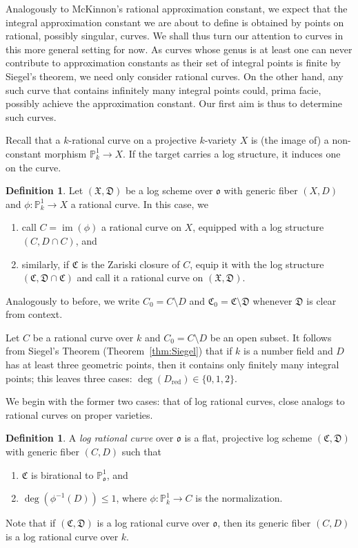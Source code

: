 \documentclass[a4paper, twoside, 11pt]{amsart}
\theoremstyle{definition}
\newtheorem{definition}[theorem]{Definition}
\newcommand{\mC}{\mathfrak{C}}
\newcommand{\mD}{\mathfrak{D}}
\newcommand{\mX}{\mathfrak{X}}
\newcommand{\fo}{\mathfrak{o}}
\newcommand{\PP}{\mathbb{P}}
\DeclareMathOperator{\im}{im}
\newcommand{\red}{\mathrm{red}}
\begin{document}
Analogously to McKinnon's rational approximation constant, we expect that the integral approximation constant we are about to define is obtained by points on rational, possibly singular, curves. We shall thus turn our attention to curves in this more general setting for now.
As curves whose genus is at least one can never contribute to approximation constants as their set of integral points is finite by Siegel's theorem, we need only consider rational curves.
On the other hand, any such curve that contains infinitely many integral points could, prima facie, possibly achieve the approximation constant. Our first aim is thus to determine such curves.

Recall that a $k$-rational curve on a projective $k$-variety $X$ is (the image of) a non-constant morphism $\PP^1_k\to X$. If the target carries a log structure, it induces one on the curve.
\begin{definition}
	Let $(\mX,\mD)$ be a log scheme over $\fo$ with generic fiber $(X,D)$ and $\phi\colon \PP^1_k\to X$ a rational curve. In this case, we
	\begin{enumerate}
		\item call $C=\im(\phi)$ a rational curve on $X$, equipped with a log structure $(C,D\cap C)$, and
		\item similarly, if $\mC$ is the Zariski closure of $C$, equip it with the log structure $(\mC,\mD\cap \mC)$ and call it a rational curve on $(\mX,\mD)$.
	\end{enumerate}
	Analogously to before, we write $C_0 = C\setminus D$ and $\mC_0 = \mC \setminus \mD$ whenever $\mD$ is clear from context.
\end{definition}


Let $C$ be a rational curve over $k$ and $C_0 = C\setminus D$ be an open subset.
It follows from Siegel's Theorem (Theorem~\ref{thm:Siegel}) that if $k$ is a number field and $D$ 
has at least three geometric points, then it contains only finitely many integral points; this leaves three cases: $\deg(D_\red)\in \{0,1,2\}$.

We begin with the former two cases: that of log rational curves, close analogs to rational curves on proper varieties.
\begin{definition}
	A \emph{log rational curve} over $\fo$ is a flat, projective log scheme $(\mC,\mD)$ with generic fiber $(C,D)$ such that
	\begin{enumerate}
		\item $\mC$ is birational to $\PP^1_\fo$, and
		\item $\deg(\phi^{-1}(D))\le 1$, where $\phi\colon \PP_k^1\to C$ is the normalization.
	\end{enumerate}
	Note that if $(\mC,\mD)$ is a log rational curve over $\fo$, then its generic fiber $(C,D)$ is a log rational curve over $k$.
\end{definition}
\end{document}
